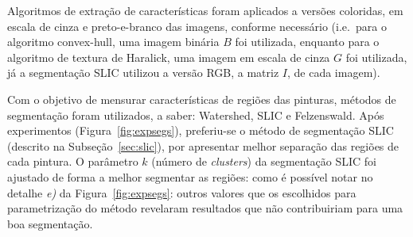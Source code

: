 Algoritmos de extração de características foram aplicados a versões coloridas,
em escala de cinza e preto-e-branco das imagens, conforme necessário (i.e.\ para
o algoritmo convex-hull, uma imagem binária $B$ foi utilizada, enquanto para o
algoritmo de textura de Haralick, uma imagem em escala de cinza $G$ foi
utilizada, já a segmentação SLIC utilizou a versão RGB, a matriz $I$, de cada
imagem).

Com o objetivo de mensurar características de regiões das pinturas, métodos de
segmentação foram utilizados, a saber: Watershed, SLIC e Felzenswald. Após
experimentos (Figura~\ref{fig:expsegs}), preferiu-se o método de segmentação
SLIC (descrito na Subseção~\ref{sec:slic}), por apresentar melhor separação das
regiões de cada pintura. O parâmetro $k$ (número de \textit{clusters}) da
segmentação SLIC foi ajustado de forma a melhor segmentar as regiões: como é
possível notar no detalhe \textit{e)} da Figura~\ref{fig:expsegs}: outros
valores que os escolhidos para parametrização do método revelaram resultados que
não contribuiriam para uma boa segmentação.

